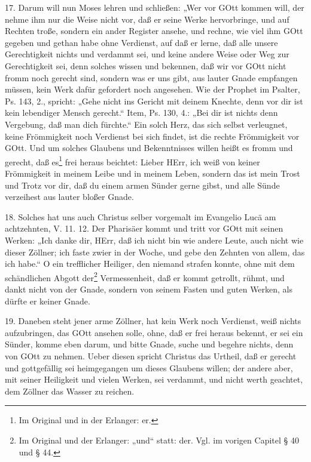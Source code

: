 17. Darum will nun Moses lehren und schließen: „Wer vor GOtt kommen will, der nehme ihm nur die Weise nicht vor, daß er seine Werke hervorbringe, und auf Rechten troße, sondern ein ander Register ansehe, und rechne, wie viel ihm GOtt gegeben und gethan habe ohne Verdienst, auf daß er lerne, daß alle unsere Gerechtigkeit nichts und verdammt sei, und keine andere Weise oder Weg zur Gerechtigkeit sei, denn solches wissen und bekennen, daß wir vor
GOtt nicht fromm noch gerecht sind, sondern was er uns gibt, aus lauter Gnade empfangen müssen, kein Werk dafür gefordert noch angesehen. Wie der Prophet im Psalter, Ps. 143, 2., spricht: „Gehe nicht ins Gericht mit deinem Knechte, denn vor dir ist kein lebendiger Mensch gerecht.“ Item, Ps. 130, 4.: „Bei dir ist nichts denn Vergebung, daß man dich fürchte.“ Ein solch Herz, das sich selbst verleugnet, keine Frömmigkeit noch Verdienst bei sich findet, ist die rechte Frömmigkeit vor GOtt. Und um solches Glaubens und Bekenntnisses willen heißt es fromm und gerecht, daß es\footnote{Im Original und in der Erlanger: er.} frei heraus beichtet: Lieber HErr, ich weiß von keiner Frömmigkeit in meinem Leibe und in meinem Leben, sondern das ist mein Trost und Trotz vor dir, daß du einem armen Sünder gerne gibst, und alle Sünde verzeihest aus lauter bloßer Gnade.

18. Solches hat uns auch Christus selber vorgemalt im Evangelio Lucä am achtzehnten, V. 11. 12. Der Pharisäer kommt und tritt vor GOtt mit seinen Werken: „Ich danke dir, HErr, daß ich nicht bin wie andere Leute, auch nicht wie dieser Zöllner; ich faste zwier in der Woche, und gebe den Zehnten von allem, das ich habe.“ O ein trefflicher Heiliger, den niemand strafen konnte, ohne mit dem schändlichen Abgott der\footnote{Im Original und der Erlanger: „und“ statt: der. Vgl. im vorigen Capitel § 40 und § 44.} Vermessenheit, daß er kommt getrollt, rühmt, und dankt nicht von der Gnade, sondern von seinem Fasten und guten Werken, als dürfte er keiner Gnade.

19. Daneben steht jener arme Zöllner, hat kein Werk noch Verdienst, weiß nichts aufzubringen, das GOtt ansehen solle, ohne, daß er frei heraus bekennt, er sei ein Sünder, komme eben darum, und bitte Gnade, suche und begehre nichts, denn von GOtt zu nehmen. Ueber diesen spricht Christus das Urtheil, daß er gerecht und gottgefällig sei heimgegangen um dieses Glaubens willen; der andere aber, mit seiner Heiligkeit und vielen Werken, sei verdammt, und nicht werth geachtet, dem Zöllner das Wasser zu reichen.


